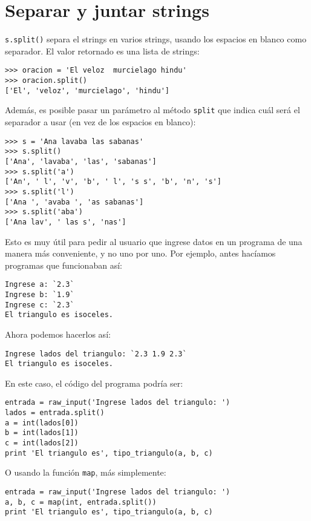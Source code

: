\section{Separar y juntar strings}

\lstinline!s.split()! separa el strings en varios strings, usando los
espacios en blanco como separador. El valor retornado es una lista de
strings:

\begin{lstlisting}
>>> oracion = 'El veloz  murcielago hindu'
>>> oracion.split()
['El', 'veloz', 'murcielago', 'hindu']
\end{lstlisting}

Además, es posible pasar un parámetro al método \lstinline!split! que
indica cuál será el separador a usar (en vez de los espacios en blanco):

\begin{lstlisting}
>>> s = 'Ana lavaba las sabanas'
>>> s.split()
['Ana', 'lavaba', 'las', 'sabanas']
>>> s.split('a')
['An', ' l', 'v', 'b', ' l', 's s', 'b', 'n', 's']
>>> s.split('l')
['Ana ', 'avaba ', 'as sabanas']
>>> s.split('aba')
['Ana lav', ' las s', 'nas']
\end{lstlisting}

Esto es muy útil para pedir al usuario que ingrese datos en un programa
de una manera más conveniente, y no uno por uno. Por ejemplo, antes
hacíamos programas que funcionaban así:
\begin{lstlisting}[language=testcase]
Ingrese a: `2.3`
Ingrese b: `1.9`
Ingrese c: `2.3`
El triangulo es isoceles.
\end{lstlisting}

Ahora podemos hacerlos así:
\begin{lstlisting}[language=testcase]
Ingrese lados del triangulo: `2.3 1.9 2.3`
El triangulo es isoceles.
\end{lstlisting}

En este caso, el código del programa podría ser:

\begin{lstlisting}
entrada = raw_input('Ingrese lados del triangulo: ')
lados = entrada.split()
a = int(lados[0])
b = int(lados[1])
c = int(lados[2])
print 'El triangulo es', tipo_triangulo(a, b, c)
\end{lstlisting}

O usando la función \lstinline!map!, más simplemente:

\begin{lstlisting}
entrada = raw_input('Ingrese lados del triangulo: ')
a, b, c = map(int, entrada.split())
print 'El triangulo es', tipo_triangulo(a, b, c)
\end{lstlisting}

